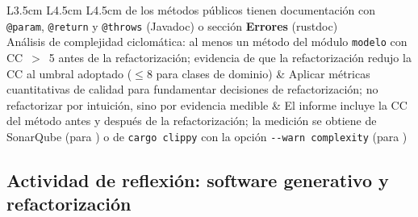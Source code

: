 \begin{longtable}{L{3.5cm} L{4.5cm} L{4.5cm}}
  de los métodos públicos tienen documentación con \texttt{@param}, \texttt{@return}
  y \texttt{@throws} (Javadoc) o sección \textbf{Errores} (rustdoc) \\
  \midrule
  Análisis de complejidad ciclomática: al menos un método del módulo \texttt{modelo}
  con CC~$>$~5 antes de la refactorización; evidencia de que la refactorización
  redujo la CC al umbral adoptado ($\leq 8$ para clases de dominio)
  &
  Aplicar métricas cuantitativas de calidad para fundamentar decisiones de
  refactorización; no refactorizar por intuición, sino por evidencia medible
  &
  El informe incluye la CC del método antes y después de la refactorización;
  la medición se obtiene de SonarQube (para \java) o de \texttt{cargo clippy}
  con la opción \texttt{-{}-warn complexity} (para \rust) \\
  \bottomrule
  \caption{Entregables, características y rúbrica del Sprint~11.}
  \label{tab:sprint11}
\end{longtable}

\subsection*{Actividad de reflexión: software generativo y refactorización}
\label{act:ia-sprint11}


